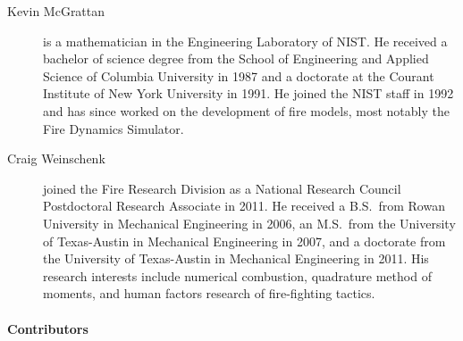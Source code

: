 \begin{description}
\item[Kevin McGrattan] is a mathematician in the Engineering Laboratory of NIST. He received a bachelor of science degree from the School of Engineering and Applied Science of Columbia University in 1987 and a doctorate at the Courant Institute of New York University in 1991. He joined the NIST staff in 1992 and has since worked on the development of fire models, most notably the Fire Dynamics Simulator.
    
\item[Craig Weinschenk] joined the Fire Research Division as a National Research Council Postdoctoral Research Associate in 2011. He received a B.S.~from Rowan University in Mechanical Engineering in 2006, an M.S.~from the University of Texas-Austin in Mechanical Engineering in 2007, and a doctorate from the University of Texas-Austin in Mechanical Engineering in 2011. His research interests include numerical combustion, quadrature method of moments, and human factors research of fire-fighting tactics.

\end{description}

\paragraph{Contributors}

